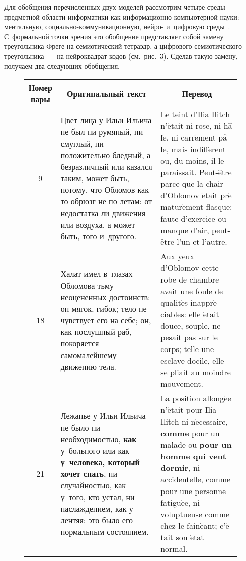 {\begin{multicols}{2}
      Для обобщения перечисленных двух моделей рассмотрим четыре среды предметной 
области информатики как ин\-фор\-ма\-ци\-он\-но-компью\-тер\-ной науки: ментальную, 
со\-ци\-аль\-но-ком\-му\-ни\-ка\-ци\-он\-ную, нейро- и~цифровую среды~\cite{12-zat}. 
С~формальной 
точки зрения это обобщение представляет собой замену треугольника Фреге на 
семиотический тет\-раэдр, а цифрового семиотического треугольника~--- на нейроквадрат кодов 
(см.\ рис.~3). Сделав такую замену, получаем два следующих обобщения.

      \begin{figure*}[b] %
\vspace*{9pt}
      \begin{center}
      {\small
      \begin{tabular}{|c|p{65mm}|p{65mm}|}
      \hline
\multicolumn{1}{|c|}{Номер пары}&
\multicolumn{1}{c|}{Оригинальный текст}&
\multicolumn{1}{c|}{Перевод}\\
\hline
\hphantom{9}9&Цвет лица у Ильи Ильича не был ни румяный, ни смуглый, ни положительно бледный, а 
безразличный или казался таким, может быть, потому, что Обломов как-то обрюзг не по 
летам: от недостатка ли движения или воздуха, а может быть, того и~другого.&Le teint d'Ilia 
Ilitch n'$\acute{\mbox{e}}$tait ni rose, ni h$\hat{\mbox{a}}$l$\acute{\mbox{e}}$, 
ni carr$\acute{\mbox{e}}$ment p$\hat{\mbox{a}}$le, mais indiff$\acute{\mbox{e}}$rent ou, du 
moins, il le paraissait. Peut-$\hat{\mbox{e}}$tre parce que la chair d'Oblomov 
$\acute{\mbox{e}}$tait pr$\acute{\mbox{e}}$matur$\acute{\mbox{e}}$ment flasque: faute 
d'exercice ou manque d'air, peut-$\hat{\mbox{e}}$tre l'un et l'autre.\\
\hline
18&Халат имел в~глазах Обломова тьму неоцененных достоинств: он мягок, гибок; тело не 
чувствует его на себе; он, как послушный раб, покоряется самомалейшему движению 
тела.&Aux yeux d'Oblomov cette robe de chambre avait une foule de qualit$\acute{\mbox{e}}$s 
inappr$\acute{\mbox{e}}$ciables: elle $\acute{\mbox{e}}$tait douce, souple, ne pesait pas sur le 
corps; telle une esclave docile, elle se pliait au moindre mouvement.\\
\hline
21&Лежанье у Ильи Ильича не было ни необходимостью, \textbf{как} у~больного или как 
\textbf{у~человека, который хочет спать}, ни случайностью, как у~того, кто устал, ни 
наслаждением, как у лентяя: это было его нормальным состоянием.&La position 
allong$\acute{\mbox{e}}$e n'$\acute{\mbox{e}}$tait pour Ilia Ilitch ni 
n$\acute{\mbox{e}}$cessaire, \textbf{comme} pour un malade ou \textbf{pour un homme qui 
veut dormir}, ni accidentelle, comme pour une personne fatigu$\acute{\mbox{e}}$e, ni 
voluptueuse comme chez le fain$\acute{\mbox{e}}$ant; c'$\acute{\mbox{e}}$tait son 
$\acute{\mbox{e}}$tat normal.\\
\hline
\end{tabular}
}
\end{center}


\end{figure*}
\end{multicols}}
